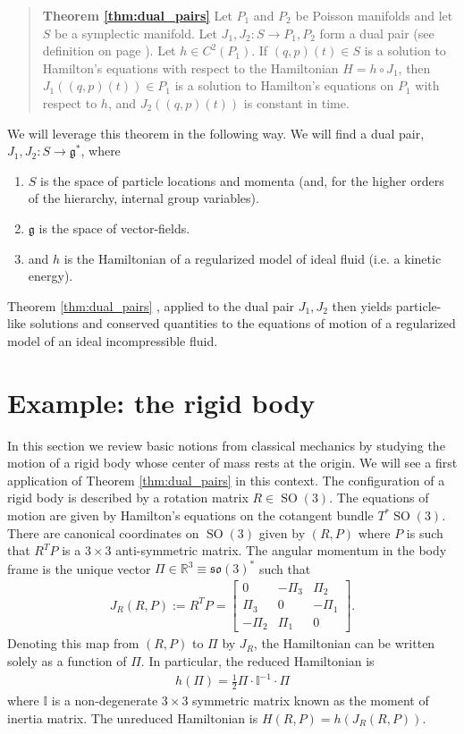 \documentclass[12pt]{amsart}
\newcommand{\so}{\ensuremath{\mathfrak{so}}}
\DeclareMathOperator{\SO}{SO}
\begin{document}
  \begin{quote}
    {\bf Theorem \ref{thm:dual_pairs}}
    Let $P_1$ and $P_2$ be Poisson manifolds and let $S$ be
    a symplectic manifold.  Let $J_1,J_2:S \to P_1,P_2$ form a dual pair 
    (see definition on page \pageref{thm:dual_pairs}).
    Let $h \in C^2(P_1)$.
    If $(q,p)(t) \in S$ is a solution to Hamilton's equations
    with respect to the Hamiltonian $H = h \circ J_1$,
    then $J_1\left( (q,p)(t) \right) \in P_1$ is a solution
    to Hamilton's equations on $P_1$ with respect to $h$,
    and $J_2( (q,p)(t))$ is constant in time.
  \end{quote}

We will leverage this theorem in the following way.
We will find a dual pair, $J_1,J_2: S \to \mathfrak{g}^*$, where
\begin{enumerate}
\item $S$ is the space of particle locations and momenta (and, for the higher orders of the hierarchy, internal group variables).
\item $\mathfrak{g}$ is the space of vector-fields.
\item and $h$ is the Hamiltonian of a regularized model of ideal fluid (i.e. a kinetic energy).
\end{enumerate}
 Theorem \ref{thm:dual_pairs} , applied to the dual pair $J_1,J_2$ 
 then yields particle-like solutions and conserved quantities to the equations of motion
of a regularized model of an ideal incompressible fluid.

\section{Example: the rigid body}
\label{sec:rigid_body}
  In this section we review basic notions from classical mechanics
by studying the motion of a rigid body whose center of mass rests
at the origin.
We will see a first application of Theorem \ref{thm:dual_pairs}
in this context.
The configuration of a rigid body is described by a
rotation matrix $R \in \SO(3)$.
The equations of motion are given by Hamilton's equations
on the cotangent bundle $T^*\SO(3)$.
There are canonical coordinates on $\SO(3)$ given by $(R,P)$
where $P$ is such that $R^TP $ is a $3 \times 3$ anti-symmetric matrix.
The angular momentum in the body frame is the
unique vector $\Pi \in \mathbb{R}^3 \equiv \so(3)^*$ such that
\begin{align*}
  J_R(R,P) := R^TP = \begin{bmatrix}
    0 & -\Pi_3 & \Pi_2 \\
    \Pi_3 & 0 & -\Pi_1 \\
    -\Pi_2 & \Pi_1 & 0 
    \end{bmatrix}.
\end{align*}
Denoting this map from $(R,P)$ to $\Pi$ by $J_R$,
the Hamiltonian can be written solely as a function
of $\Pi$.  In particular, the reduced Hamiltonian is
\begin{align*}
  h(\Pi) = \frac{1}{2}\Pi \cdot \mathbb{I}^{-1} \cdot \Pi
\end{align*}
where $\mathbb{I}$ is a non-degenerate $3\times 3$ symmetric matrix
known as the moment of inertia matrix.
The unreduced Hamiltonian is $H(R,P) = h(J_R(R,P))$.
\end{document}
